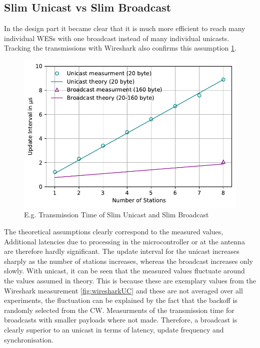 \subsection*{Slim Unicast vs Slim Broadcast}

In the design part it became clear that it is much more efficient 
to reach many individual WESs with one broadcast instead of many individual unicasts.
Tracking the transmissions with Wireshark also confirms this assumption \cref{fig:transmissionTime}.

\begin{figure}[h]
	\centering
	\includegraphics[scale=0.6]{../Plot2/Graphs/bc_uc_transmissiontime_wireshark.pdf}
	\caption{E.g. Transmission Time of Slim Unicast and Slim Broadcast}
	\label{fig:transmissionTime}
\end{figure}

The theoretical assumptions clearly correspond to the measured values,
Additional latencies due to processing in the microcontroller or at the antenna are therefore hardly significant.
The update interval for the unicast increases sharply as the number of stations increases,
whereas the broadcast increases only slowly. With unicast, it can be seen that the measured values fluctuate around the values assumed in theory.
This is because these are exemplary values from the Wireshark measurement \cref{fig:wiresharkUC} and these are not averaged over all experiments,
the fluctuation can be explained by the fact that the backoff is randomly selected from the \ac{CW}.
Measurments of the transmission time for broadcasts with smaller payloads where not made.
Therefore, a broadcast is clearly superior to an unicast in terms of latency, update frequency and synchronisation.

